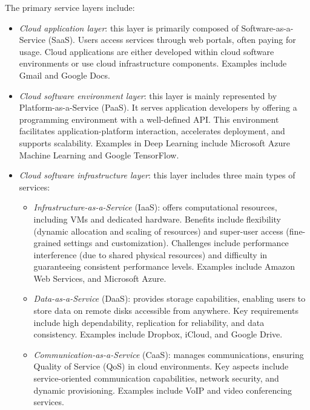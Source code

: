 The primary service layers include:
\begin{itemize}
    \item \textit{Cloud application layer}: this layer is primarily composed of Software-as-a-Service (SaaS). 
        Users access services through web portals, often paying for usage. 
        Cloud applications are either developed within cloud software environments or use cloud infrastructure components. 
        Examples include Gmail and Google Docs.
    \item \textit{Cloud software environment layer}: this layer is mainly represented by Platform-as-a-Service (PaaS). 
        It serves application developers by offering a programming environment with a well-defined API. 
        This environment facilitates application-platform interaction, accelerates deployment, and supports scalability. 
        Examples in Deep Learning include Microsoft Azure Machine Learning and Google TensorFlow.
    \item \textit{Cloud software infrastructure layer}: this layer includes three main types of services:
        \begin{itemize}
            \item \textit{Infrastructure-as-a-Service} (IaaS): offers computational resources, including VMs and dedicated hardware. 
                Benefits include flexibility (dynamic allocation and scaling of resources) and super-user access (fine-grained settings and customization). 
                Challenges include performance interference (due to shared physical resources) and difficulty in guaranteeing consistent performance levels.
                Examples include Amazon Web Services, and Microsoft Azure. 
            \item \textit{Data-as-a-Service} (DaaS): provides storage capabilities, enabling users to store data on remote disks accessible from anywhere. 
                Key requirements include high dependability, replication for reliability, and data consistency. 
                Examples include Dropbox, iCloud, and Google Drive.
            \item \textit{Communication-as-a-Service} (CaaS): manages communications, ensuring Quality of Service (QoS) in cloud environments. 
                Key aspects include service-oriented communication capabilities, network security, and dynamic provisioning. 
                Examples include VoIP and video conferencing services.
        \end{itemize}
\end{itemize}

